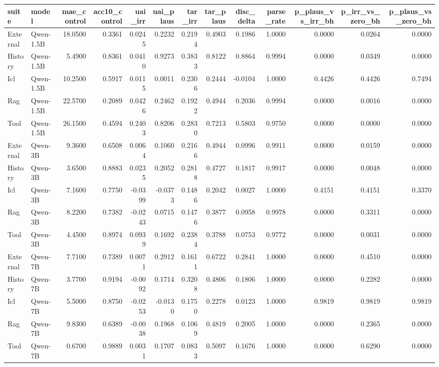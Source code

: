 \begin{tabular}{llrrrrrrrrrrr}
\toprule
suite & model & mae_control & acc10_control & uai_irr & uai_plaus & tar_irr & tar_plaus & disc_delta & parse_rate & p_plaus_vs_irr_bh & p_irr_vs_zero_bh & p_plaus_vs_zero_bh \\
\midrule
External & Qwen-1.5B & 18.0500 & 0.3361 & 0.0245 & 0.2232 & 0.2194 & 0.4903 & 0.1986 & 1.0000 & 0.0000 & 0.0264 & 0.0000 \\
History & Qwen-1.5B & 5.4900 & 0.8361 & 0.0410 & 0.9273 & 0.3833 & 0.8122 & 0.8864 & 0.9994 & 0.0000 & 0.0349 & 0.0000 \\
Icl & Qwen-1.5B & 10.2500 & 0.5917 & 0.0115 & 0.0011 & 0.2306 & 0.2444 & -0.0104 & 1.0000 & 0.4426 & 0.4426 & 0.7494 \\
Rag & Qwen-1.5B & 22.5700 & 0.2089 & 0.0426 & 0.2462 & 0.1922 & 0.4944 & 0.2036 & 0.9994 & 0.0000 & 0.0016 & 0.0000 \\
Tool & Qwen-1.5B & 26.1500 & 0.4594 & 0.2403 & 0.8206 & 0.2830 & 0.7213 & 0.5803 & 0.9750 & 0.0000 & 0.0000 & 0.0000 \\
External & Qwen-3B & 9.3600 & 0.6508 & 0.0064 & 0.1060 & 0.2166 & 0.4944 & 0.0996 & 0.9911 & 0.0000 & 0.0159 & 0.0000 \\
History & Qwen-3B & 3.6500 & 0.8883 & 0.0235 & 0.2052 & 0.2818 & 0.4727 & 0.1817 & 0.9917 & 0.0000 & 0.0048 & 0.0000 \\
Icl & Qwen-3B & 7.1600 & 0.7750 & -0.0399 & -0.0373 & 0.1486 & 0.2042 & 0.0027 & 1.0000 & 0.4151 & 0.4151 & 0.3370 \\
Rag & Qwen-3B & 8.2200 & 0.7382 & -0.0243 & 0.0715 & 0.1476 & 0.3877 & 0.0958 & 0.9978 & 0.0000 & 0.3311 & 0.0000 \\
Tool & Qwen-3B & 4.4500 & 0.8974 & 0.0939 & 0.1692 & 0.2384 & 0.3788 & 0.0753 & 0.9772 & 0.0000 & 0.0031 & 0.0000 \\
External & Qwen-7B & 7.7100 & 0.7389 & 0.0071 & 0.2912 & 0.1611 & 0.6722 & 0.2841 & 1.0000 & 0.0000 & 0.4510 & 0.0000 \\
History & Qwen-7B & 3.7700 & 0.9194 & -0.0092 & 0.1714 & 0.3208 & 0.4806 & 0.1806 & 1.0000 & 0.0000 & 0.2282 & 0.0000 \\
Icl & Qwen-7B & 5.5000 & 0.8750 & -0.0253 & -0.0130 & 0.1750 & 0.2278 & 0.0123 & 1.0000 & 0.9819 & 0.9819 & 0.9819 \\
Rag & Qwen-7B & 9.8300 & 0.6389 & -0.0038 & 0.1968 & 0.1069 & 0.4819 & 0.2005 & 1.0000 & 0.0000 & 0.2365 & 0.0000 \\
Tool & Qwen-7B & 0.6700 & 0.9889 & 0.0031 & 0.1707 & 0.0833 & 0.5097 & 0.1676 & 1.0000 & 0.0000 & 0.6290 & 0.0000 \\

\end{tabular}
